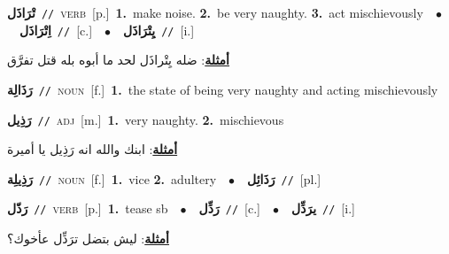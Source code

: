 \documentclass[10pt,a4paper,twoside]{article} %
\begin{document}
\begin{multicols}{2}
{\setlength\topsep{0pt}\textbf{\foreignlanguage{arabic}{تْرَاذَل}}\ {\color{gray}\texttt{//}\color{black}}\ \textsc{verb}\ [p.]\ \textbf{1.}~make noise.  \textbf{2.}~be very naughty.  \textbf{3.}~act mischievously\ \ $\bullet$\ \ \setlength\topsep{0pt}\textbf{\foreignlanguage{arabic}{اِتْرَاذَل}}\ {\color{gray}\texttt{//}\color{black}}\ [c.]\ \ $\bullet$\ \ \setlength\topsep{0pt}\textbf{\foreignlanguage{arabic}{يِتْرَاذَل}}\ {\color{gray}\texttt{//}\color{black}}\ [i.]\  \begin{flushright}\color{gray}\foreignlanguage{arabic}{\textbf{\underline{\foreignlanguage{arabic}{أمثلة}}}: ضله يِتْراذَل لحد ما أبوه بله قتل تفرَّق}\end{flushright}\color{black}} \vspace{2mm}

{\setlength\topsep{0pt}\textbf{\foreignlanguage{arabic}{رَذَالِة}}\ {\color{gray}\texttt{//}\color{black}}\ \textsc{noun}\ [f.]\ \textbf{1.}~the state of being very naughty and acting mischievously\ } \vspace{2mm}

{\setlength\topsep{0pt}\textbf{\foreignlanguage{arabic}{رَذِيل}}\ {\color{gray}\texttt{//}\color{black}}\ \textsc{adj}\ [m.]\ \textbf{1.}~very naughty.  \textbf{2.}~mischievous\  \begin{flushright}\color{gray}\foreignlanguage{arabic}{\textbf{\underline{\foreignlanguage{arabic}{أمثلة}}}: ابنك والله انه رَذِيل يا أميرة}\end{flushright}\color{black}} \vspace{2mm}

{\setlength\topsep{0pt}\textbf{\foreignlanguage{arabic}{رَذِيلِة}}\ {\color{gray}\texttt{//}\color{black}}\ \textsc{noun}\ [f.]\ \textbf{1.}~vice  \textbf{2.}~adultery\ \ $\bullet$\ \ \setlength\topsep{0pt}\textbf{\foreignlanguage{arabic}{رَذَائِل}}\ {\color{gray}\texttt{//}\color{black}}\ [pl.]\ } \vspace{2mm}

{\setlength\topsep{0pt}\textbf{\foreignlanguage{arabic}{رَذّل}}\ {\color{gray}\texttt{//}\color{black}}\ \textsc{verb}\ [p.]\ \textbf{1.}~tease sb\ \ $\bullet$\ \ \setlength\topsep{0pt}\textbf{\foreignlanguage{arabic}{رَذِّل}}\ {\color{gray}\texttt{//}\color{black}}\ [c.]\ \ $\bullet$\ \ \setlength\topsep{0pt}\textbf{\foreignlanguage{arabic}{يرَذِّل}}\ {\color{gray}\texttt{//}\color{black}}\ [i.]\  \begin{flushright}\color{gray}\foreignlanguage{arabic}{\textbf{\underline{\foreignlanguage{arabic}{أمثلة}}}: ليش بتضل ترَذِّل عأخوك؟}\end{flushright}\color{black}} \vspace{2mm}


\end{multicols}
\end{document}
